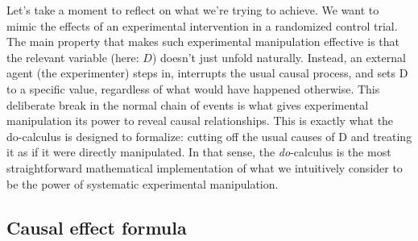 \documentclass[nobib]{tufte-handout}
\newcommand{\docalc}{\emph{do}-calculus\xspace}
\newcommand{\doop}{\emph{do}-operation\xspace}
\begin{document}
\begin{marginfigure}[-1cm]

  \caption{Intervening on a variable in a cDAG amounts to removing all influence from any causally upstream variable.}
  \label{fig:cDAGs-pruned}
\end{marginfigure}

Let’s take a moment to reflect on what we’re trying to achieve.
We want to mimic the effects of an experimental intervention in a randomized control trial.
The main property that makes such experimental manipulation effective is that the relevant variable (here: $D$) doesn't just unfold naturally.
Instead, an external agent (the experimenter) steps in, interrupts the usual causal process, and sets D to a specific value, regardless of what would have happened otherwise. 
This deliberate break in the normal chain of events is what gives experimental manipulation its power to reveal causal relationships.
This is exactly what the do-calculus is designed to formalize: cutting off the usual causes of D and treating it as if it were directly manipulated.
In that sense, the \docalc is the most straightforward mathematical implementation of what we intuitively consider to be the power of systematic experimental manipulation.

\subsection{Causal effect formula} \label{sec:causal-effect-formula}
\end{document}
